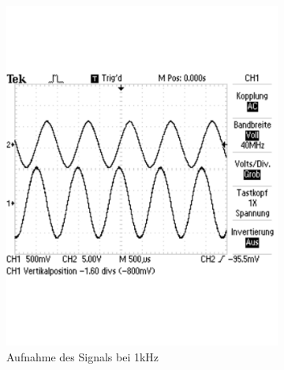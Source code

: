 \documentclass[12pt,a4paper]{article}
\begin{document}
\begin{figure}[H]
\begin{subfigure}[b]{0.28\textwidth}
                \includegraphics[width=\textwidth , scale = 0.4]{2_6_sin_1k.pdf}
                \caption[Aufnahme des Signals bei 1kHz]{Aufnahme des Signals bei 1kHz}
                \label{fig:2_6_sin_1k}
        \end{subfigure}
        \hfill
        \begin{subfigure}[b]{0.28\textwidth}

\end{subfigure}
\end{figure}
\end{document}
